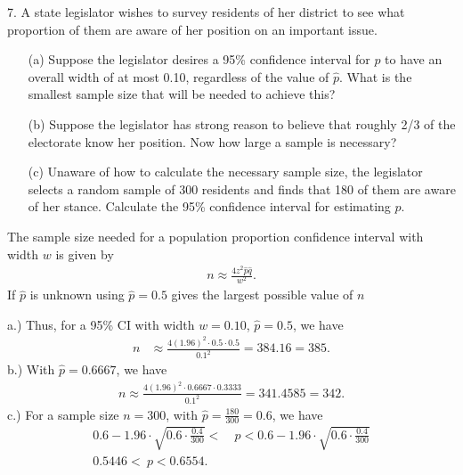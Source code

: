 \documentclass{report}
\begin{document}
\pagebreak \bigbreak \noindent 
\begin{mdframed}
7. A state legislator wishes to survey residents of her district to see what proportion of them are aware of her position on an important issue.
\begin{itemize}
    \item[(a)] Suppose the legislator desires a 95\% confidence interval for $p$ to have an overall width of at most 0.10, regardless of the value of $\hat{p}$. What is the smallest sample size that will be needed to achieve this?
    \item[(b)] Suppose the legislator has strong reason to believe that roughly 2/3 of the electorate know her position. Now how large a sample is necessary?
    \item[(c)] Unaware of how to calculate the necessary sample size, the legislator selects a random sample of 300 residents and finds that 180 of them are aware of her stance. Calculate the 95\% confidence interval for estimating $p$.
\end{itemize}
\end{mdframed}
\bigbreak \noindent 
\begin{remark}
    The sample size needed for a population proportion confidence interval  with width $w$ is given by
    \begin{align*}
        n \approx  \frac{4z^{2}\hat{p}\hat{q}}{w^{2}}
    .\end{align*}
    If $\hat{p}$ is unknown using $\hat{p} = 0.5$ gives the largest possible value of $n$
    \smiley{} 
\end{remark}
\bigbreak \noindent 
a.) Thus, for a 95\% CI with width $w=0.10$, $\hat{p} = 0.5$, we have
\begin{align*}
    n &\approx \frac{4(1.96)^{2}\cdot 0.5\cdot 0.5}{0.1^{2}} = 384.16 = 385
.\end{align*}
\bigbreak \noindent 
b.) With $\hat{p} = 0.6667$, we have
\begin{align*}
    n \approx \frac{4(1.96)^{2} \cdot 0.6667 \cdot 0.3333}{0.1^{2}} = 341.4585 = 342
.\end{align*}
\bigbreak \noindent 
c.) For a sample size $n=300$, with $\hat{p} = \frac{180}{300} = 0.6$, we have
\begin{align*}
    0.6 - 1.96 \cdot \sqrt{0.6 \cdot \frac{0.4}{300}} <\ &p < 0.6-1.96 \cdot \sqrt{0.6 \cdot \frac{0.4}{300}} \\
    0.5446 <\ p < 0.6554
.\end{align*}
\end{document}
